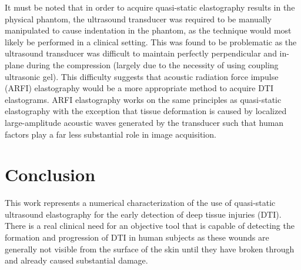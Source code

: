 			It must be noted that in order to acquire quasi-static elastography results in the physical phantom, the ultrasound transducer was required to be manually manipulated to cause indentation in the phantom, as the technique would most likely be performed in a clinical setting. This was found to be problematic as the ultrasound transducer was difficult to maintain perfectly perpendicular and in-plane during the compression (largely due to the necessity of using coupling ultrasonic gel). This difficulty suggests that acoustic radiation force impulse (ARFI) elastography would be a more appropriate method to acquire DTI elastograms. ARFI elastography works on the same principles as quasi-static elastography with the exception that tissue deformation is caused by localized large-amplitude acoustic waves generated by the transducer such that human factors play a far less substantial role in image acquisition.

	\section{Conclusion}
		This work represents a numerical characterization of the use of quasi-static ultrasound elastography for the early detection of deep tissue injuries (DTI). There is a real clinical need for an objective tool that is capable of detecting the formation and progression of DTI in human subjects as these wounds are generally not visible from the surface of the skin until they have broken through and already caused substantial damage.


